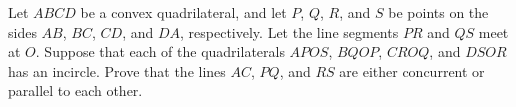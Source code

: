 Let $ABCD$ be a convex quadrilateral, and let $P$, $Q$, $R$, and $S$ be points on the sides $AB$, $BC$, $CD$, and $DA$, respectively. Let the line segments $PR$ and $QS$ meet at $O$. Suppose that each of the quadrilaterals $APOS$, $BQOP$, $CROQ$, and $DSOR$ has an incircle. Prove that the lines $AC$, $PQ$, and $RS$ are either concurrent or parallel to each other.
